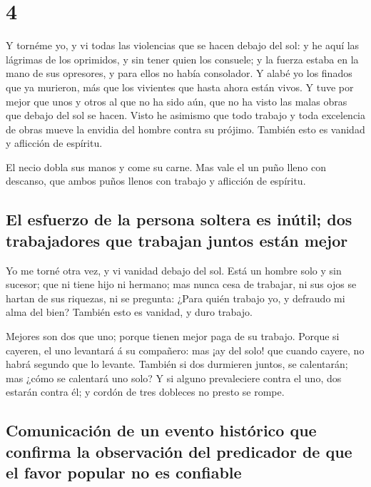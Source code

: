 \hypertarget{section-3}{%
\section{4}\label{section-3}}

 Y tornéme yo, y vi todas las violencias que se hacen
debajo del sol: y he aquí las lágrimas de los oprimidos, y sin tener
quien los consuele; y la fuerza estaba en la mano de sus opresores, y
para ellos no había consolador.  Y alabé yo los finados
que ya murieron, más que los vivientes que hasta ahora están vivos.
 Y tuve por mejor que unos y otros al que no ha sido aún,
que no ha visto las malas obras que debajo del sol se hacen.
 Visto he asimismo que todo trabajo y toda excelencia de
obras mueve la envidia del hombre contra su prójimo. También esto es
vanidad y aflicción de espíritu.

 El necio dobla sus manos y come su carne. 
Mas vale el un puño lleno con descanso, que ambos puños llenos con
trabajo y aflicción de espíritu.

\hypertarget{el-esfuerzo-de-la-persona-soltera-es-inuxfatil-dos-trabajadores-que-trabajan-juntos-estuxe1n-mejor}{%
\subsection{El esfuerzo de la persona soltera es inútil; dos
trabajadores que trabajan juntos están
mejor}\label{el-esfuerzo-de-la-persona-soltera-es-inuxfatil-dos-trabajadores-que-trabajan-juntos-estuxe1n-mejor}}

 Yo me torné otra vez, y vi vanidad debajo del sol.
 Está un hombre solo y sin sucesor; que ni tiene hijo ni
hermano; mas nunca cesa de trabajar, ni sus ojos se hartan de sus
riquezas, ni se pregunta: ¿Para quién trabajo yo, y defraudo mi alma del
bien? También esto es vanidad, y duro trabajo.

 Mejores son dos que uno; porque tienen mejor paga de su
trabajo.  Porque si cayeren, el uno levantará á su
compañero: mas ¡ay del solo! que cuando cayere, no habrá segundo que lo
levante.  También si dos durmieren juntos, se calentarán;
mas ¿cómo se calentará uno solo?  Y si alguno
prevaleciere contra el uno, dos estarán contra él; y cordón de tres
dobleces no presto se rompe.

\hypertarget{comunicaciuxf3n-de-un-evento-histuxf3rico-que-confirma-la-observaciuxf3n-del-predicador-de-que-el-favor-popular-no-es-confiable}{%
\subsection{Comunicación de un evento histórico que confirma la
observación del predicador de que el favor popular no es
confiable}\label{comunicaciuxf3n-de-un-evento-histuxf3rico-que-confirma-la-observaciuxf3n-del-predicador-de-que-el-favor-popular-no-es-confiable}}

